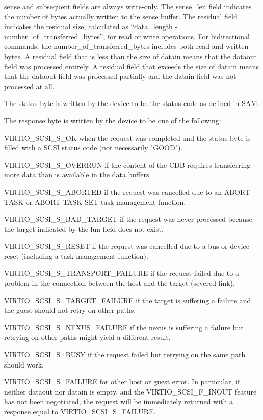 sense and subsequent fields are always write-only. The sense_len
field indicates the number of bytes actually written to the sense
buffer. The residual field indicates the residual size,
calculated as “data_length - number_of_transferred_bytes”, for
read or write operations. For bidirectional commands, the
number_of_transferred_bytes includes both read and written bytes.
A residual field that is less than the size of datain means that
the dataout field was processed entirely. A residual field that
exceeds the size of datain means that the dataout field was
processed partially and the datain field was not processed at
all.

The status byte is written by the device to be the status code as
defined in SAM.

The response byte is written by the device to be one of the
following:

  VIRTIO_SCSI_S_OK when the request was completed and the status
  byte is filled with a SCSI status code (not necessarily
  "GOOD").

  VIRTIO_SCSI_S_OVERRUN if the content of the CDB requires
  transferring more data than is available in the data buffers.

  VIRTIO_SCSI_S_ABORTED if the request was cancelled due to an
  ABORT TASK or ABORT TASK SET task management function.

  VIRTIO_SCSI_S_BAD_TARGET if the request was never processed
  because the target indicated by the lun field does not exist.

  VIRTIO_SCSI_S_RESET if the request was cancelled due to a bus
  or device reset (including a task management function).

  VIRTIO_SCSI_S_TRANSPORT_FAILURE if the request failed due to a
  problem in the connection between the host and the target
  (severed link).

  VIRTIO_SCSI_S_TARGET_FAILURE if the target is suffering a
  failure and the guest should not retry on other paths.

  VIRTIO_SCSI_S_NEXUS_FAILURE if the nexus is suffering a failure
  but retrying on other paths might yield a different result.

  VIRTIO_SCSI_S_BUSY if the request failed but retrying on the
  same path should work.

  VIRTIO_SCSI_S_FAILURE for other host or guest error. In
  particular, if neither dataout nor datain is empty, and the
  VIRTIO_SCSI_F_INOUT feature has not been negotiated, the
  request will be immediately returned with a response equal to
  VIRTIO_SCSI_S_FAILURE.

